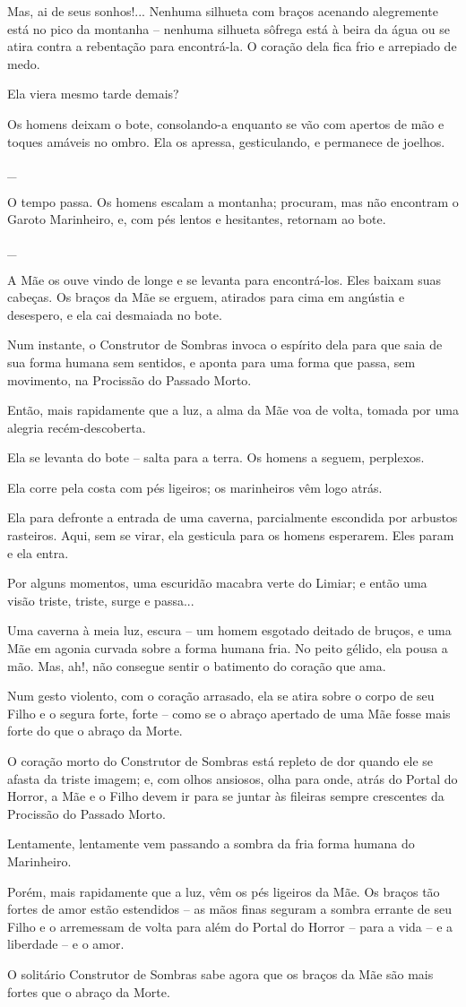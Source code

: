 Mas, ai de seus sonhos!... Nenhuma silhueta com braços acenando
alegremente está no pico da montanha -- nenhuma silhueta sôfrega está à
beira da água ou se atira contra a rebentação para encontrá-la. O
coração dela fica frio e arrepiado de medo.

Ela viera mesmo tarde demais?

Os homens deixam o bote, consolando-a enquanto se vão com apertos de mão
e toques amáveis no ombro. Ela os apressa, gesticulando, e permanece de
joelhos.

\_

O tempo passa. Os homens escalam a montanha; procuram, mas não encontram
o Garoto Marinheiro, e, com pés lentos e hesitantes, retornam ao bote.

\_

A Mãe os ouve vindo de longe e se levanta para encontrá-los. Eles baixam
suas cabeças. Os braços da Mãe se erguem, atirados para cima em angústia
e desespero, e ela cai desmaiada no bote.

Num instante, o Construtor de Sombras invoca o espírito dela para que
saia de sua forma humana sem sentidos, e aponta para uma forma que
passa, sem movimento, na Procissão do Passado Morto.

Então, mais rapidamente que a luz, a alma da Mãe voa de volta, tomada
por uma alegria recém-descoberta.

Ela se levanta do bote -- salta para a terra. Os homens a seguem,
perplexos.

Ela corre pela costa com pés ligeiros; os marinheiros vêm logo atrás.

Ela para defronte a entrada de uma caverna, parcialmente escondida por
arbustos rasteiros. Aqui, sem se virar, ela gesticula para os homens
esperarem. Eles param e ela entra.

\smallskip
Por alguns momentos, uma escuridão macabra verte do Limiar; e então uma
visão triste, triste, surge e passa...

Uma caverna à meia luz, escura -- um homem esgotado deitado de bruços, e
uma Mãe em agonia curvada sobre a forma humana fria. No peito gélido,
ela pousa a mão. Mas, ah!, não consegue sentir o batimento do coração
que ama.

Num gesto violento, com o coração arrasado, ela se atira sobre o corpo
de seu Filho e o segura forte, forte -- como se o abraço apertado de uma
Mãe fosse mais forte do que o abraço da Morte.

\smallskip
O coração morto do Construtor de Sombras está repleto de dor quando ele
se afasta da triste imagem; e, com olhos ansiosos, olha para onde, atrás
do Portal do Horror, a Mãe e o Filho devem ir para se juntar às fileiras
sempre crescentes da Procissão do Passado Morto.

Lentamente, lentamente vem passando a sombra da fria forma humana do
Marinheiro.

\smallskip
Porém, mais rapidamente que a luz, vêm os pés ligeiros da Mãe. Os braços
tão fortes de amor estão estendidos -- as mãos finas seguram a sombra
errante de seu Filho e o arremessam de volta para além do Portal do
Horror -- para a vida -- e a liberdade -- e o amor.

O solitário Construtor de Sombras sabe agora que os braços da Mãe são
mais fortes que o abraço da Morte.
